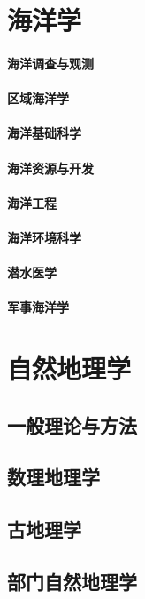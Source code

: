 \documentclass[UTF8]{../NatureUniverse}
\begin{document}
\chapter{海洋学}
\subsubsection{海洋调查与观测}
\subsubsection{区域海洋学}
\subsubsection{海洋基础科学}
\subsubsection{海洋资源与开发}
\subsubsection{海洋工程}
\subsubsection{海洋环境科学}
\subsubsection{潜水医学}
\subsubsection{军事海洋学}






\chapter{自然地理学}
\section{一般理论与方法}
\section{数理地理学}
\section{古地理学}
\section{部门自然地理学}
\end{document}
